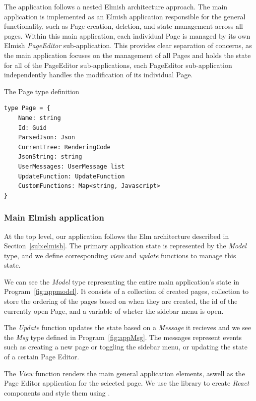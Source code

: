 The application follows a nested Elmish architecture approach.
The main application is implemented as an Elmish application responsible for the general functionality, such as Page creation, deletion, and state management across all pages.
Within this main application, each individual Page is managed by its own Elmish \emph{PageEditor} sub-application.
This provides clear separation of concerns, as the main application focuses on the management of all Pages and holds the state for all of the PageEditor sub-applications,
each PageEditor sub-application independently handles the modification of its individual Page.

\begin{listing}[H]
	\caption{The Page type definition}
	\label{prog:page}
	\begin{lstlisting}
type Page = {
    Name: string
    Id: Guid
    ParsedJson: Json
    CurrentTree: RenderingCode
    JsonString: string
    UserMessages: UserMessage list
    UpdateFunction: UpdateFunction
    CustomFunctions: Map<string, Javascript>
}
  \end{lstlisting}
\end{listing}


\subsubsection{Main Elmish application}
At the top level, our application follows the Elm architecture described in Section~\ref{sub:elmish}.
The primary application state is represented by the \emph{Model} type, and we define corresponding \emph{view} and \emph{update} functions to manage this state.

We can see the \emph{Model} type representing the entire main application's state in Program~\ref{fig:appmodel}.
It consists of a collection of created pages, collection to store the ordering of the pages based on when they are created, the id of the currently open Page, and a variable of wheter the sidebar menu is open.

The \emph{Update} function updates the state based on a \emph{Message} it recieves and we see the \emph{Msg} type defined in Program~\ref{fig:appMsg}.
The messages represent events such as creating a new page or toggling the sidebar menu, or updating the state of a certain Page Editor.

The \emph{View} function renders the main general application elements, aswell as the Page Editor application for the selected page.
We use the \citet{feliz} library to create \emph{React} components and style them using \citet{tailwind}.

